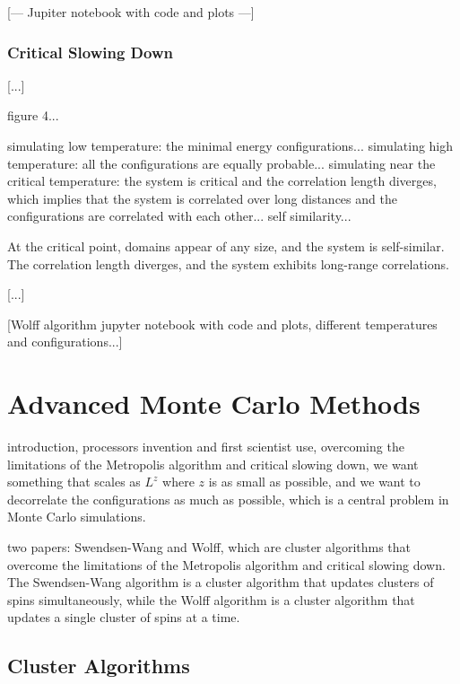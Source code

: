     [--- Jupiter notebook with code and plots ---]

\subsubsection{Critical Slowing Down}

[...]

figure 4...

simulating low temperature: the minimal energy configurations... simulating high temperature: all the configurations are equally probable... simulating near the critical temperature: the system is critical and the correlation length diverges, which implies that the system is correlated over long distances and the configurations are correlated with each other... self similarity...

\begin{example}

    At the critical point, domains appear of any size, and the system is self-similar. The correlation length diverges, and the system exhibits long-range correlations.

        [...]

\end{example}

[Wolff algorithm jupyter notebook with code and plots, different temperatures and configurations...]

\section{Advanced Monte Carlo Methods}

introduction, processors invention and first scientist use, overcoming the limitations of the Metropolis algorithm and critical slowing down, we want something that scales as \(L^z\) where \(z\) is as small as possible, and we want to decorrelate the configurations as much as possible, which is a central problem in Monte Carlo simulations.

two papers: Swendsen-Wang and Wolff, which are cluster algorithms that overcome the limitations of the Metropolis algorithm and critical slowing down. The Swendsen-Wang algorithm is a cluster algorithm that updates clusters of spins simultaneously, while the Wolff algorithm is a cluster algorithm that updates a single cluster of spins at a time.

\subsection{Cluster Algorithms}

